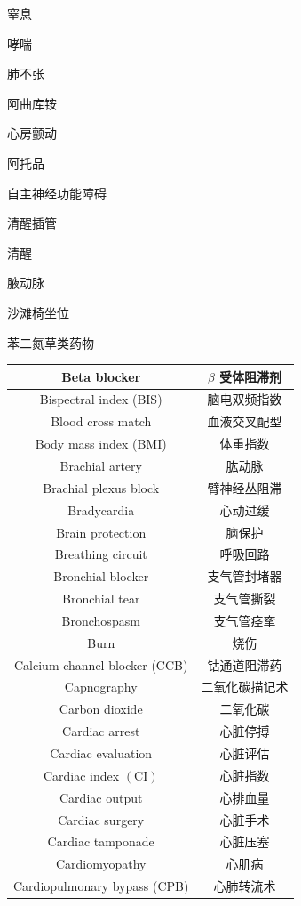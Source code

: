 \documentclass[10pt]{article}
\begin{document}
窒息

哮喘

肺不张

阿曲库铵

心房颤动

阿托品

自主神经功能障碍

清醒插管

清醒

腋动脉

沙滩椅坐位

苯二氮草类药物

\begin{center}
\begin{tabular}{|c|c|}
\hline
Beta blocker & $\beta$ 受体阻滞剂 \\
\hline
Bispectral index (BIS) & 脑电双频指数 \\
\hline
Blood cross match & 血液交叉配型 \\
\hline
Body mass index (BMI) & 体重指数 \\
\hline
Brachial artery & 肱动脉 \\
\hline
Brachial plexus block & 臂神经丛阻滞 \\
\hline
Bradycardia & 心动过缓 \\
\hline
Brain protection & 脑保护 \\
\hline
Breathing circuit & 呼吸回路 \\
\hline
Bronchial blocker & 支气管封堵器 \\
\hline
Bronchial tear & 支气管撕裂 \\
\hline
Bronchospasm & 支气管痉挛 \\
\hline
Burn & 烧伤 \\
\hline
Calcium channel blocker (CCB) & 钴通道阻滞药 \\
\hline
Capnography & 二氧化碳描记术 \\
\hline
Carbon dioxide & 二氧化碳 \\
\hline
Cardiac arrest & 心脏停搏 \\
\hline
Cardiac evaluation & 心脏评估 \\
\hline
Cardiac index $(\mathrm{CI})$ & 心脏指数 \\
\hline
Cardiac output & 心排血量 \\
\hline
Cardiac surgery & 心脏手术 \\
\hline
Cardiac tamponade & 心脏压塞 \\
\hline
Cardiomyopathy & 心肌病 \\
\hline
Cardiopulmonary bypass (CPB) & 心肺转流术 \\

\end{tabular}
\end{center}
\end{document}
